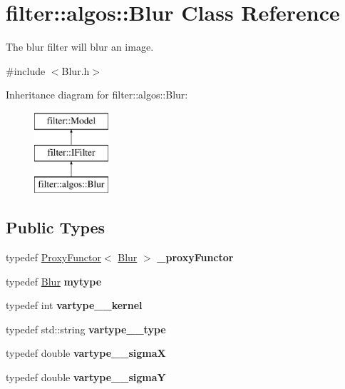 \hypertarget{classfilter_1_1algos_1_1_blur}{}\section{filter\+:\+:algos\+:\+:Blur Class Reference}
\label{classfilter_1_1algos_1_1_blur}


The blur filter will blur an image.  




{\ttfamily \#include $<$Blur.\+h$>$}

Inheritance diagram for filter\+:\+:algos\+:\+:Blur\+:\begin{figure}[H]
\begin{center}
\leavevmode
\includegraphics[height=3.000000cm]{d9/d35/classfilter_1_1algos_1_1_blur}
\end{center}
\end{figure}
\subsection*{Public Types}
\begin{DoxyCompactItemize}
\item 
\mbox{\label{classfilter_1_1algos_1_1_blur_a573165691ed9e001beff00d0a617b76e}} 
typedef \hyperlink{class_proxy_functor}{Proxy\+Functor}$<$ \hyperlink{classfilter_1_1algos_1_1_blur}{Blur} $>$ {\bfseries \+\_\+proxy\+Functor}
\item 
\mbox{\label{classfilter_1_1algos_1_1_blur_a183ef1e2b7d99ac2d94e2829f2b06a6e}} 
typedef \hyperlink{classfilter_1_1algos_1_1_blur}{Blur} {\bfseries mytype}
\item 
\mbox{\label{classfilter_1_1algos_1_1_blur_a31524be6436340debec25f4f22c8039b}} 
typedef int {\bfseries vartype\+\_\+\+\_\+kernel}
\item 
\mbox{\label{classfilter_1_1algos_1_1_blur_a499bc97976cac8f27bf0e14a81994a5c}} 
typedef std\+::string {\bfseries vartype\+\_\+\+\_\+type}
\item 
\mbox{\label{classfilter_1_1algos_1_1_blur_a1912f92052a7094322e72e01c177ea96}} 
typedef double {\bfseries vartype\+\_\+\+\_\+sigmaX}
\item 
\mbox{\label{classfilter_1_1algos_1_1_blur_a6dca814ffbe7e9702acfa2c5ec8754e5}} 
typedef double {\bfseries vartype\+\_\+\+\_\+sigmaY}
\end{DoxyCompactItemize}
